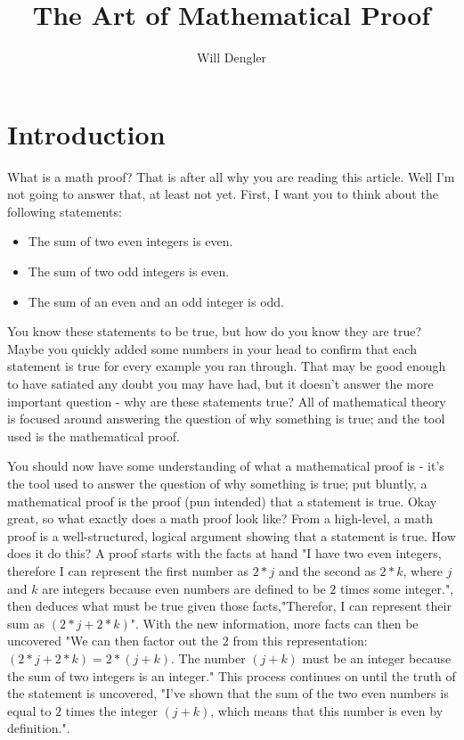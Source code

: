 \documentclass[a4paper,12pt]{article}
\begin{document}
\title{The Art of Mathematical Proof}
\author{Will Dengler}
\maketitle

\section{Introduction}
What is a math proof? That is after all why you are reading this article. Well I'm not going to answer that, at least not yet. First, I want you to think about the following statements:
\begin{itemize}
	\item The sum of two even integers is even.
	\item The sum of two odd integers is even.
	\item The sum of an even and an odd integer is odd.
\end{itemize}

You know these statements to be true, but how do you know they are true? Maybe you quickly added some numbers in your head to confirm that each statement is true for every example you ran through. That may be good enough to have satiated any doubt you may have had, but it doesn't answer the more important question - why are these statements true? All of mathematical theory is focused around answering the question of why something is true; and the tool used is the mathematical proof. 

You should now have some understanding of what a mathematical proof is - it's the tool used to answer the question of why something is true; put bluntly, a mathematical proof is the proof (pun intended) that a statement is true. Okay great, so what exactly does a math proof look like? From a high-level, a math proof is a well-structured, logical argument showing that a statement is true. How does it do this? A proof starts with the facts at hand "I have two even integers, therefore I can represent the first number as  $2*j$ and the second as $2*k$, where $j$ and $k$ are integers because even numbers are defined to be $2$ times some integer.", then deduces what must be true given those facts,"Therefor, I can represent their sum as $(2*j + 2*k)$". With the new information, more facts can then be uncovered "We can then factor out the $2$ from this representation:  $(2*j + 2*k) = 2*(j + k)$. The number $(j + k)$ must be an integer because the sum of two integers is an integer." This process continues on until the truth of the statement is uncovered, "I've shown that the sum of the two even numbers is equal to $2$ times the integer $(j + k)$, which means that this number is even by definition.". 
\end{document}
